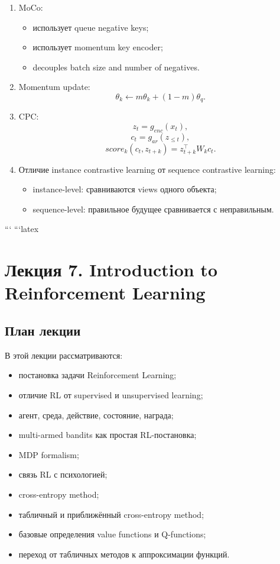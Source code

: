 \documentclass[a4paper,12pt]{article}
\begin{document}
\begin{enumerate}
    \item MoCo:
    \begin{itemize}
        \item использует queue negative keys;
        \item использует momentum key encoder;
        \item decouples batch size and number of negatives.
    \end{itemize}

    \item Momentum update:
    \[
    \theta_k
    \leftarrow
    m\theta_k + (1-m)\theta_q.
    \]

    \item CPC:
    \[
    z_t = g_{enc}(x_t),
    \]
    \[
    c_t = g_{ar}(z_{\leq t}),
    \]
    \[
    score_k(c_t,z_{t+k})
    =
    z_{t+k}^{\top}W_kc_t.
    \]

    \item Отличие instance contrastive learning от sequence contrastive learning:
    \begin{itemize}
        \item instance-level: сравниваются views одного объекта;
        \item sequence-level: правильное будущее сравнивается с неправильным.
    \end{itemize}
\end{enumerate}
```
```latex
\section{Лекция 7. Introduction to Reinforcement Learning}

\subsection{План лекции}

В этой лекции рассматриваются:

\begin{itemize}
    \item постановка задачи Reinforcement Learning;
    \item отличие RL от supervised и unsupervised learning;
    \item агент, среда, действие, состояние, награда;
    \item multi-armed bandits как простая RL-постановка;
    \item MDP formalism;
    \item связь RL с психологией;
    \item cross-entropy method;
    \item табличный и приближённый cross-entropy method;
    \item базовые определения value functions и Q-functions;
    \item переход от табличных методов к аппроксимации функций.
\end{itemize}
\end{document}
